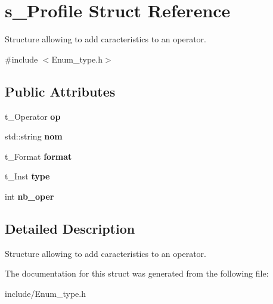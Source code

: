 \hypertarget{structs___profile}{}\section{s\+\_\+\+Profile Struct Reference}
\label{structs___profile}


Structure allowing to add caracteristics to an operator.  




{\ttfamily \#include $<$Enum\+\_\+type.\+h$>$}

\subsection*{Public Attributes}
\begin{DoxyCompactItemize}
\item 
\mbox{\label{structs___profile_a3debabafa904b8f4c5e7bf2bda2a5e60}} 
t\+\_\+\+Operator {\bfseries op}
\item 
\mbox{\label{structs___profile_ab9f52013690834dd36766d356c90c449}} 
std\+::string {\bfseries nom}
\item 
\mbox{\label{structs___profile_ae8153795530389f76f6c56bdeac40d46}} 
t\+\_\+\+Format {\bfseries format}
\item 
\mbox{\label{structs___profile_a2a8c53bcb4fb28c3aa368a27954d9b1b}} 
t\+\_\+\+Inst {\bfseries type}
\item 
\mbox{\label{structs___profile_a7930c41fdfa4249a1c147edf7ac68822}} 
int {\bfseries nb\+\_\+oper}
\end{DoxyCompactItemize}


\subsection{Detailed Description}
Structure allowing to add caracteristics to an operator. 

The documentation for this struct was generated from the following file\+:\begin{DoxyCompactItemize}
\item 
include/Enum\+\_\+type.\+h\end{DoxyCompactItemize}
